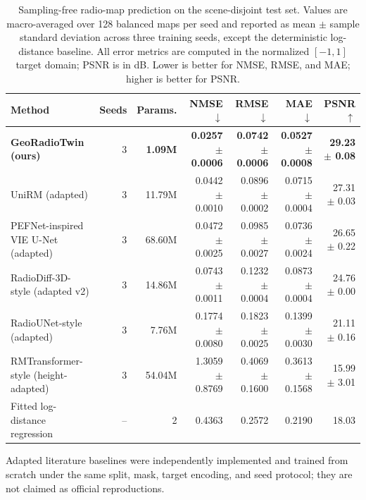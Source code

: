 \begin{table}[t]
\centering
\caption{Sampling-free radio-map prediction on the scene-disjoint test set. Values are macro-averaged over 128 balanced maps per seed and reported as mean $\pm$ sample standard deviation across three training seeds, except the deterministic log-distance baseline. All error metrics are computed in the normalized $[-1,1]$ target domain; PSNR is in dB. Lower is better for NMSE, RMSE, and MAE; higher is better for PSNR.}
\label{tab:main_results}
\setlength{\tabcolsep}{4.5pt}
\begin{tabular}{lrrrrrr}
\toprule
Method & Seeds & Params. & NMSE $\downarrow$ & RMSE $\downarrow$ & MAE $\downarrow$ & PSNR $\uparrow$ \\
\midrule
\textbf{GeoRadioTwin (ours)} & 3 & \textbf{1.09M} & \textbf{0.0257 $\pm$ 0.0006} & \textbf{0.0742 $\pm$ 0.0006} & \textbf{0.0527 $\pm$ 0.0008} & \textbf{29.23 $\pm$ 0.08} \\
UniRM (adapted) & 3 & 11.79M & 0.0442 $\pm$ 0.0010 & 0.0896 $\pm$ 0.0002 & 0.0715 $\pm$ 0.0004 & 27.31 $\pm$ 0.03 \\
PEFNet-inspired VIE U-Net (adapted) & 3 & 68.60M & 0.0472 $\pm$ 0.0025 & 0.0985 $\pm$ 0.0027 & 0.0736 $\pm$ 0.0024 & 26.65 $\pm$ 0.22 \\
RadioDiff-3D-style (adapted v2) & 3 & 14.86M & 0.0743 $\pm$ 0.0011 & 0.1232 $\pm$ 0.0004 & 0.0873 $\pm$ 0.0004 & 24.76 $\pm$ 0.00 \\
RadioUNet-style (adapted) & 3 & 7.76M & 0.1774 $\pm$ 0.0080 & 0.1823 $\pm$ 0.0025 & 0.1399 $\pm$ 0.0030 & 21.11 $\pm$ 0.16 \\
RMTransformer-style (height-adapted) & 3 & 54.04M & 1.3059 $\pm$ 0.8769 & 0.4069 $\pm$ 0.1600 & 0.3613 $\pm$ 0.1568 & 15.99 $\pm$ 3.01 \\
Fitted log-distance regression & -- & 2 & 0.4363 & 0.2572 & 0.2190 & 18.03 \\
\bottomrule
\end{tabular}
\vspace{2pt}
\parbox{0.98\textwidth}{\footnotesize Adapted literature baselines were independently implemented and trained from scratch under the same split, mask, target encoding, and seed protocol; they are not claimed as official reproductions.}
\end{table}
